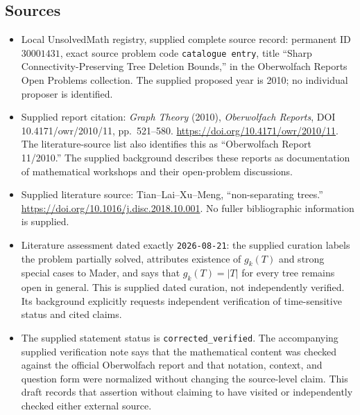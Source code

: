 \documentclass[11pt]{article}
\begin{document}
\subsection{Sources}
\begin{itemize}
\item Local UnsolvedMath registry, supplied complete source record: permanent ID \(30001431\), exact source problem code \texttt{catalogue entry}, title ``Sharp Connectivity-Preserving Tree Deletion Bounds,'' in the Oberwolfach Reports Open Problems collection. The supplied proposed year is 2010; no individual proposer is identified.
\item Supplied report citation: \emph{Graph Theory} (2010), \emph{Oberwolfach Reports}, DOI 10.4171/owr/2010/11, pp.~521--580. \url{https://doi.org/10.4171/owr/2010/11}. The literature-source list also identifies this as ``Oberwolfach Report 11/2010.'' The supplied background describes these reports as documentation of mathematical workshops and their open-problem discussions.
\item Supplied literature source: Tian--Lai--Xu--Meng, ``non-separating trees.'' \url{https://doi.org/10.1016/j.disc.2018.10.001}. No fuller bibliographic information is supplied.
\item Literature assessment dated exactly \texttt{2026-08-21}: the supplied curation labels the problem partially solved, attributes existence of \(g_k(T)\) and strong special cases to Mader, and says that \(g_k(T)=|T|\) for every tree remains open in general. This is supplied dated curation, not independently verified. Its background explicitly requests independent verification of time-sensitive status and cited claims.
\item The supplied statement status is \texttt{corrected\_verified}. The accompanying supplied verification note says that the mathematical content was checked against the official Oberwolfach report and that notation, context, and question form were normalized without changing the source-level claim. This draft records that assertion without claiming to have visited or independently checked either external source.
\end{itemize}
\end{document}
